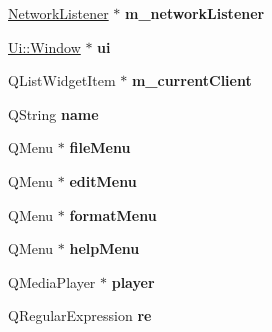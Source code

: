 \begin{DoxyCompactItemize}
\item 
\hypertarget{class_window_a8f714eb54bfde4b16da703584ac08eea}{}\hyperlink{class_network_listener}{Network\+Listener} $\ast$ {\bfseries m\+\_\+network\+Listener}\label{class_window_a8f714eb54bfde4b16da703584ac08eea}

\item 
\hypertarget{class_window_a25e6c90561394c36b5012b2c8e74a72c}{}\hyperlink{class_ui_1_1_window}{Ui\+::\+Window} $\ast$ {\bfseries ui}\label{class_window_a25e6c90561394c36b5012b2c8e74a72c}

\item 
\hypertarget{class_window_ad717ad597f2a1277c0bd8fac55c74825}{}Q\+List\+Widget\+Item $\ast$ {\bfseries m\+\_\+current\+Client}\label{class_window_ad717ad597f2a1277c0bd8fac55c74825}

\item 
\hypertarget{class_window_a277444918604b04869aeb9bfebeceb16}{}Q\+String {\bfseries name}\label{class_window_a277444918604b04869aeb9bfebeceb16}

\item 
\hypertarget{class_window_a09f6515f36fa10c11773997ff933b5bf}{}Q\+Menu $\ast$ {\bfseries file\+Menu}\label{class_window_a09f6515f36fa10c11773997ff933b5bf}

\item 
\hypertarget{class_window_a0eec65ab015e4594d6821559d36a9b16}{}Q\+Menu $\ast$ {\bfseries edit\+Menu}\label{class_window_a0eec65ab015e4594d6821559d36a9b16}

\item 
\hypertarget{class_window_a6f609551d5591985f173c8c68505335a}{}Q\+Menu $\ast$ {\bfseries format\+Menu}\label{class_window_a6f609551d5591985f173c8c68505335a}

\item 
\hypertarget{class_window_a20e4c75cbfaf22452a06f95d34b9f882}{}Q\+Menu $\ast$ {\bfseries help\+Menu}\label{class_window_a20e4c75cbfaf22452a06f95d34b9f882}

\item 
\hypertarget{class_window_a9da0abf47d6c11e6671aae6d4b3c671e}{}Q\+Media\+Player $\ast$ {\bfseries player}\label{class_window_a9da0abf47d6c11e6671aae6d4b3c671e}

\item 
\hypertarget{class_window_a0b96a9e43c5b611359ed1d0c4ecea4bb}{}Q\+Regular\+Expression {\bfseries re}\label{class_window_a0b96a9e43c5b611359ed1d0c4ecea4bb}


\end{DoxyCompactItemize}

